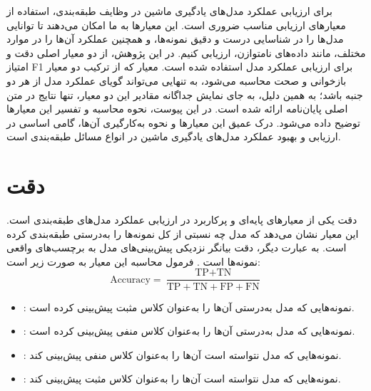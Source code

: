 
\label{appendix:evaluations}



برای ارزیابی عملکرد مدل‌های یادگیری ماشین در وظایف طبقه‌بندی، استفاده از معیارهای ارزیابی مناسب ضروری است. این معیارها به ما امکان می‌دهند تا توانایی مدل‌ها را در شناسایی درست و دقیق نمونه‌ها، و همچنین عملکرد آن‌ها را در موارد مختلف، مانند داده‌های نامتوازن، ارزیابی کنیم. در این پژوهش، از دو معیار اصلی دقت و امتیاز F1 برای ارزیابی عملکرد مدل استفاده شده است. معیار  که از ترکیب دو معیار بازخوانی و صحت محاسبه می‌شود، به تنهایی می‌تواند گویای عملکرد مدل از هر دو جنبه باشد؛ به همین دلیل، به جای نمایش جداگانه مقادیر این دو معیار، تنها نتایج  در متن اصلی پایان‌نامه ارائه شده است. در این پیوست، نحوه محاسبه و تفسیر این معیارها توضیح داده می‌شود. درک عمیق این معیارها و نحوه به‌کارگیری آن‌ها، گامی اساسی در ارزیابی و بهبود عملکرد مدل‌های یادگیری ماشین در انواع مسائل طبقه‌بندی است.

\section{دقت}
\label{appendix:accuracy}

دقت یکی از معیارهای پایه‌ای و پرکاربرد در ارزیابی عملکرد مدل‌های طبقه‌بندی است. این معیار نشان می‌دهد که مدل چه نسبتی از کل نمونه‌ها را به‌درستی طبقه‌بندی کرده است. به عبارت دیگر، دقت بیانگر نزدیکی پیش‌بینی‌های مدل به برچسب‌های واقعی نمونه‌ها است \cite{ref_sokolova2009}. فرمول محاسبه این معیار به صورت زیر است:
\begin{equation}
	\text{Accuracy} = \frac{\text{TP} + \text{TN}}{\text{TP} + \text{TN} + \text{FP} + \text{FN}}
\end{equation}

\begin{itemize}
\item \textbf{}: نمونه‌هایی که مدل به‌درستی آن‌ها را به‌عنوان کلاس مثبت پیش‌بینی کرده است.
\item \textbf{}: نمونه‌هایی که مدل به‌درستی آن‌ها را به‌عنوان کلاس منفی پیش‌بینی کرده است.
\item \textbf{}: نمونه‌هایی که مدل نتواسته است آن‌ها را به‌عنوان کلاس منفی پیش‌بینی کند.
\item \textbf{}: نمونه‌هایی که مدل نتواسته است آن‌ها را به‌عنوان کلاس مثبت پیش‌بینی کند.
\end{itemize}

